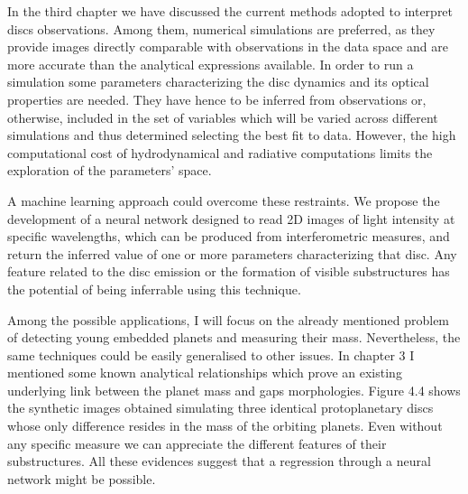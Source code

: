 \documentclass[a4paper,10pt]{report}
\begin{document}

In the third chapter we have discussed the current methods adopted to interpret discs observations.
Among them, numerical simulations are preferred, as they provide images
directly comparable with observations in the data space and are more accurate than the analytical expressions available.
In order to run a simulation some parameters characterizing the disc dynamics and its optical properties are needed.
They have hence to be inferred from observations or, otherwise, included in the set of variables which will be varied across different simulations
and thus determined selecting the best fit to data. However, the high computational cost of hydrodynamical and radiative 
computations limits the exploration of the parameters' space.

A machine learning approach could overcome these restraints. We propose the development
of a neural network designed to read 2D images of light intensity at specific wavelengths,
which can be produced from interferometric measures, and return the inferred value of one or more 
parameters characterizing that disc. Any feature related to the disc emission or the formation of visible substructures 
has the potential of being inferrable using this technique.

Among the possible applications, I will focus on the already mentioned problem of detecting young embedded planets and measuring their mass.
Nevertheless, the same techniques could be easily generalised to other issues.
In chapter 3 I mentioned some known analytical relationships which prove an existing underlying link
between the planet mass and gaps morphologies. Figure 4.4 shows the synthetic images obtained simulating
three identical protoplanetary discs whose only difference resides in the mass of the orbiting planets. 
Even without any specific measure we can appreciate the different features of their substructures.
All these evidences suggest that a regression through a neural network might be possible.
\end{document}
